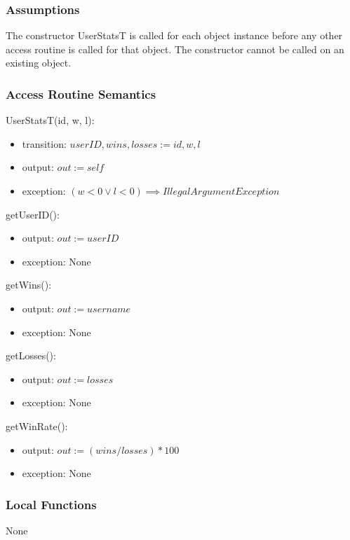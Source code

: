 \documentclass[12pt, titlepage]{article}
\begin{document}
\subsubsection{Assumptions}
The constructor UserStatsT is called for each object instance before any other access routine is called for that object. The constructor cannot be called on an existing object.

\subsubsection{Access Routine Semantics}

\noindent UserStatsT(id, w, l):
\begin{itemize}
\item transition: $userID, wins, losses := id, w, l$
\item output: $out := self$
\item exception: $(w < 0 \lor l < 0) \implies IllegalArgumentException$
\end{itemize}

\noindent getUserID():
\begin{itemize}
\item output: $out := userID$
\item exception: None
\end{itemize}

\noindent getWins():
\begin{itemize}
\item output: $out := username$
\item exception: None
\end{itemize}

\noindent getLosses():
\begin{itemize}
\item output: $out := losses$
\item exception: None
\end{itemize}

\noindent getWinRate():
\begin{itemize}
\item output: $out := (wins / losses) * 100$
\item exception: None
\end{itemize}

\subsubsection{Local Functions}

None
\newpage
\end{document}
